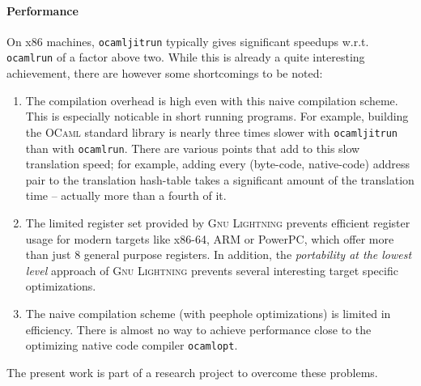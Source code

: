 \documentclass[a4paper]{acm_proc_article-sp}
\begin{document}
\paragraph{Performance}

On x86 machines, \texttt{ocamljitrun} typically gives significant
speedups w.r.t. \texttt{ocamlrun} of a factor above two. While this is already a quite
interesting achievement, there are however some shortcomings to be noted:
\begin{enumerate}
\item The compilation overhead is high even with this naive compilation scheme. This is
  especially noticable in short running programs. For example, building the \textsc{OCaml}
  standard library is nearly three times slower with \texttt{ocamljitrun} than with
  \texttt{ocamlrun}. There are various points that add to this slow translation speed; for
  example, adding every (byte-code, native-code) address pair to the translation
  hash-table takes a significant amount of the translation time -- actually more than a fourth
  of it\cite{Starynkevitch04}.
\item The limited register set provided by \textsc{Gnu Lightning} prevents efficient register
  usage for modern targets like x86-64, ARM or PowerPC, which offer more than just 8 general
  purpose registers. In addition, the \emph{portability at the lowest level} approach of
  \textsc{Gnu Lightning} prevents several interesting target specific optimizations.
\item The naive compilation scheme (with peephole optimizations) is limited in efficiency. There
  is almost no way to achieve performance close to the optimizing native code compiler \texttt{ocamlopt}.
\end{enumerate}
The present work is part of a research project to overcome these problems. 



\end{document}
